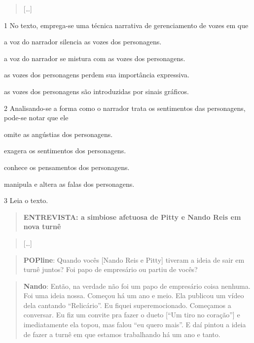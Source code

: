 \begin{quote}
{[}\ldots{]}
\end{quote}



\num{1} No texto, emprega-se uma técnica narrativa de gerenciamento de
vozes em que

\begin{escolha}
\item a voz do narrador silencia as vozes dos personagens.

\item a voz do narrador se mistura com as vozes dos personagens.

\item as vozes dos personagens perdem sua importância expressiva.

\item as vozes dos personagens são introduzidas por sinais gráficos.
\end{escolha}

\num{2} Analisando-se a forma como o narrador trata os sentimentos das personagens, pode-se notar que ele
\begin{escolha}
\item omite as angústias dos personagens.
\item exagera os sentimentos dos personagens.
\item conhece os pensamentos dos personagens.
\item manipula e altera as falas dos personagens.
\end{escolha}

\num{3} Leia o texto.


\begin{quote}
\textbf{ENTREVISTA: a simbiose afetuosa de Pitty e Nando Reis em nova
turnê}
\end{quote}

\begin{quote}
{[}\ldots{]}
\end{quote}

\begin{quote}
\textbf{POPline}: Quando vocês {[}Nando Reis e Pitty{]} tiveram a ideia
de sair em turnê juntos? Foi papo de empresário ou partiu de vocês?
\end{quote}

\begin{quote}
\textbf{Nando}: Então, na verdade não foi um papo de empresário coisa
nenhuma. Foi uma ideia nossa. Começou há um ano e meio. Ela publicou um
vídeo dela cantando ``Relicário''. Eu fiquei superemocionado. Começamos
a conversar. Eu fiz um convite pra fazer o dueto {[}``Um tiro no
coração''{]} e imediatamente ela topou, mas falou ``eu quero mais''. E
daí pintou a ideia de fazer a turnê em que estamos trabalhando há um ano
e tanto.
\end{quote}


